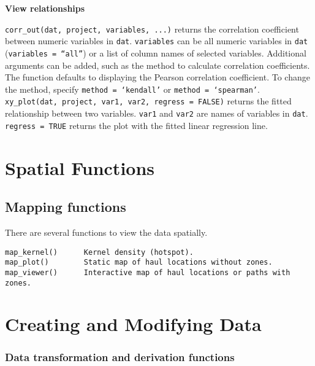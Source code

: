 \documentclass[
]{article}
\begin{document}
\textbf{View relationships}

\texttt{corr\_out(dat,\ project,\ variables,\ ...)} returns the correlation coefficient between numeric variables in \texttt{dat}. \texttt{variables} can be all numeric variables in \texttt{dat} (\texttt{variables\ =\ “all”}) or a list of column names of selected variables. Additional arguments can be added, such as the method to calculate correlation coefficients. The function defaults to displaying the Pearson correlation coefficient. To change the method, specify \texttt{method\ =\ ‘kendall’} or \texttt{method\ =\ ‘spearman’}.\\
\texttt{xy\_plot(dat,\ project,\ var1,\ var2,\ regress\ =\ FALSE)} returns the fitted relationship between two variables. \texttt{var1} and \texttt{var2} are names of variables in \texttt{dat}. \texttt{regress\ =\ TRUE} returns the plot with the fitted linear regression line.

\hypertarget{spatial-functions}{%
\section{Spatial Functions}\label{spatial-functions}}

\hypertarget{mapping-functions}{%
\subsection{Mapping functions}\label{mapping-functions}}

There are several functions to view the data spatially.

\begin{verbatim}
map_kernel()      Kernel density (hotspot).
map_plot()        Static map of haul locations without zones.   
map_viewer()      Interactive map of haul locations or paths with zones.
\end{verbatim}

\hypertarget{creating-and-modifying-data}{%
\section{Creating and Modifying Data}\label{creating-and-modifying-data}}

\hypertarget{data-transformation-and-derivation-functions}{%
\subsubsection{Data transformation and derivation functions}\label{data-transformation-and-derivation-functions}}
\end{document}
